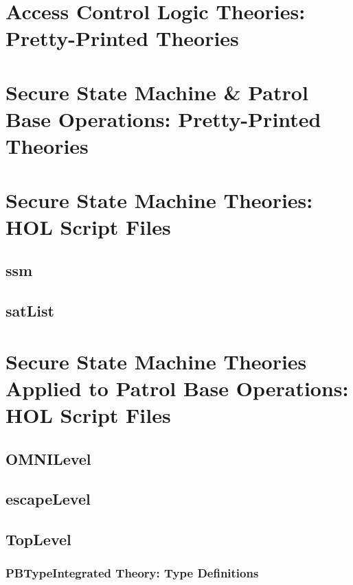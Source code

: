 \documentclass[hidelinks,12pt,a4paper]{report}
\begin{document}
\begin{appendices}

\cleardoublepage

\chapter{Access Control Logic Theories: Pretty-Printed Theories}\label{ppacl}


\chapter{Secure State Machine \& Patrol Base Operations: Pretty-Printed Theories }


\chapter{Secure State Machine Theories: HOL Script Files}\label{app:ssms}
\section{ssm}

\section{satList}



\chapter{Secure State Machine Theories Applied to Patrol Base Operations: HOL Script Files}
\section{OMNILevel}


\section{escapeLevel}
%

\section{TopLevel}
\subsection{PBTypeIntegrated Theory: Type Definitions}


\end{appendices}
\end{document}
